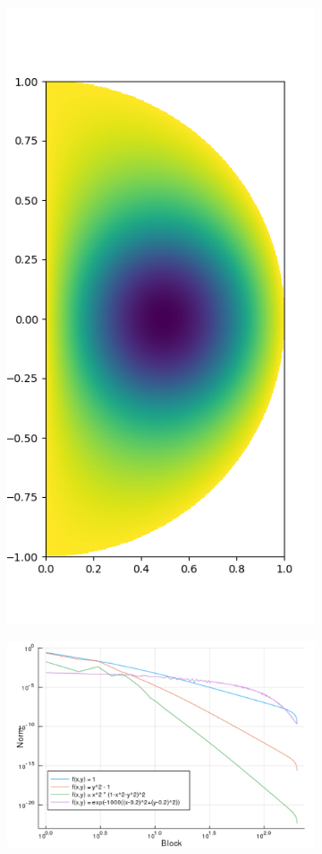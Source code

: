 \documentclass[11pt, oneside]{article}   	%
\begin{document}
\begin{figure}
	\begin{subfigure}[t]{0.3\textwidth}
	\includegraphics[scale=0.3]{solution}
	\centering
	\caption{}
        	\label{fig:solution-poisson}
	\end{subfigure}
	\begin{subfigure}[t]{0.4\textwidth}
        	\includegraphics[scale=0.4]{solutionblocknorms}

\end{subfigure}
\end{figure}
\end{document}
